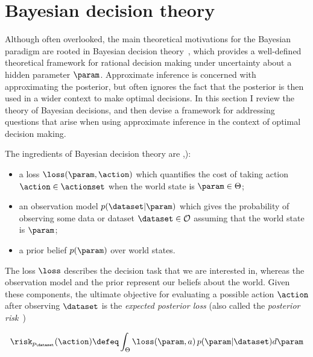 \section{Bayesian decision theory}

Although often overlooked, the main theoretical motivations for the Bayesian paradigm are rooted in Bayesian decision theory~\citep{berger85decision}, which provides a well-defined theoretical framework for rational decision making under uncertainty about a hidden parameter $\param$. Approximate inference is concerned with approximating the posterior, but often ignores the fact that the posterior is then used in a wider context to make optimal decisions. In this section I review the theory of Bayesian decisions, and then devise a framework for addressing questions that arise when using approximate inference in the context of optimal decision making.

The ingredients of Bayesian decision theory are \citep[][Chapter 2]{robert01choice},\citep[][Chapter 1]{berger85decision}):
\vspace{-.3cm}
\begin{itemize}
  \item a loss $\loss(\param,\action)$ which quantifies the cost of taking action $\action \in \actionset$ when the world state is $\param \in \Theta$; %
  \item an observation model $p(\dataset|\param)$ which gives the probability of observing some data or dataset $\dataset \in \mathcal{O}$ assuming that the world state is $\param$;
  \item a prior belief $p(\param)$ over world states.
\end{itemize}

The loss $\loss$ describes the decision task that we are interested in, whereas the observation model and the prior represent our beliefs about the world. Given these components, the ultimate objective for evaluating a possible action $\action$ after observing $\dataset$ is the \emph{expected posterior loss} (also called the \emph{posterior risk}~\citep{schervish95theory})

\begin{equation}
	\risk_{p_\dataset}(\action) \defeq \int_\Theta \loss(\param, a) \, p(\param|\dataset) d\param
\end{equation}

